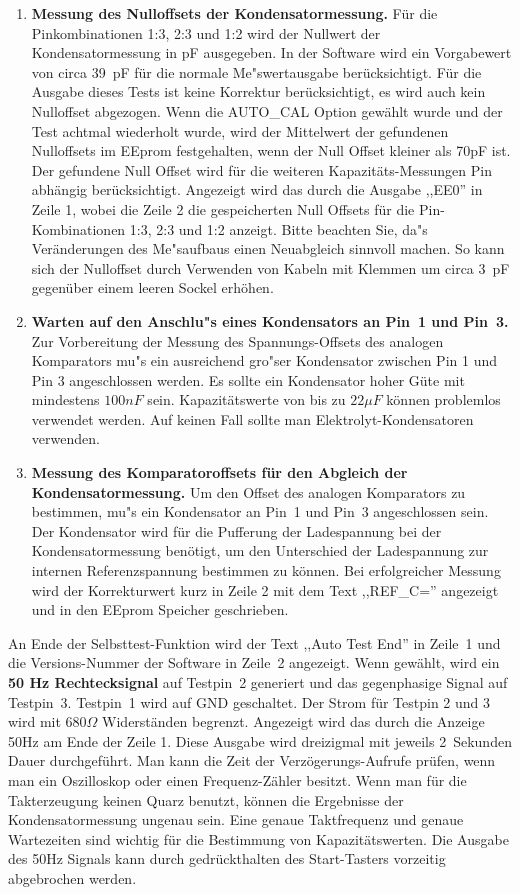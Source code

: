 \begin{enumerate}
\item {\bf Messung des Nulloffsets der Kondensatormessung.}
F\"ur die Pinkombinationen 1:3, 2:3 und 1:2 wird der Nullwert der Kondensatormessung in pF ausgegeben.
In der Software wird ein Vorgabewert von circa 39~pF f\"ur die normale Me"swertausgabe ber\"ucksichtigt.
F\"ur die Ausgabe dieses Tests ist keine Korrektur ber\"ucksichtigt, es wird auch kein Nulloffset abgezogen.
Wenn die AUTO\_CAL Option gew\"ahlt wurde und der Test achtmal wiederholt wurde, wird der Mittelwert
der gefundenen Nulloffsets im EEprom festgehalten, wenn der Null Offset kleiner als 70pF ist.
Der gefundene Null Offset wird f\"ur die weiteren Kapazit\"ats-Messungen Pin abh\"angig ber\"ucksichtigt.
Angezeigt wird das durch die Ausgabe ,,EE0''  in Zeile 1, wobei die Zeile 2 die gespeicherten Null Offsets f\"ur
die Pin-Kombinationen 1:3, 2:3 und 1:2 anzeigt.
Bitte beachten Sie, da"s Ver\"anderungen des Me"saufbaus einen Neuabgleich sinnvoll machen.
So kann sich der Nulloffset durch Verwenden von Kabeln mit Klemmen um circa 3~pF gegen\"uber einem leeren
Sockel erh\"ohen.

\item {\bf Warten auf den Anschlu"s eines Kondensators an Pin~1 und Pin~3.}
Zur Vorbereitung der Messung des Spannungs-Offsets des analogen Komparators mu"s ein ausreichend gro"ser
Kondensator zwischen Pin 1 und Pin 3 angeschlossen werden.
 Es sollte ein Kondensator hoher G\"ute mit
mindestens \(100 nF\) sein. Kapazit\"atswerte von bis zu \(22 \mu F\) k\"onnen problemlos verwendet werden.
Auf keinen Fall sollte man Elektrolyt-Kondensatoren verwenden.


\item {\bf Messung des Komparatoroffsets f\"ur den Abgleich der Kondensatormessung.}
Um den Offset des analogen Komparators zu bestimmen, mu"s ein Kondensator an Pin~1 und Pin~3 angeschlossen sein.
Der Kondensator wird f\"ur die Pufferung der Ladespannung bei der Kondensatormessung ben\"otigt, um den Unterschied der 
Ladespannung zur internen Referenzspannung bestimmen zu k\"onnen.
Bei erfolgreicher Messung wird der Korrekturwert kurz in Zeile 2 mit dem Text ,,REF\_C='' angezeigt und in den EEprom Speicher geschrieben.

\end{enumerate}

An Ende der Selbsttest-Funktion wird der Text ,,Auto Test End'' in Zeile~1 und die Versions-Nummer der Software in Zeile~2 angezeigt.
Wenn gew\"ahlt, wird ein {\bf 50 Hz Rechtecksignal} auf Testpin~2 generiert und das gegenphasige Signal auf Testpin~3.
Testpin~1 wird auf GND geschaltet. Der Strom f\"ur Testpin 2 und 3 wird mit \(680\Omega\) Widerst\"anden begrenzt.
Angezeigt wird das durch die Anzeige 50Hz am Ende der Zeile 1.
Diese Ausgabe wird dreizigmal mit jeweils 2~Sekunden Dauer durchgef\"uhrt.
Man kann die Zeit der Verz\"ogerungs-Aufrufe pr\"ufen, wenn man ein Oszilloskop oder einen
Frequenz-Z\"ahler besitzt.
Wenn man f\"ur die Takterzeugung keinen Quarz benutzt, k\"onnen die
Ergebnisse der Kondensatormessung ungenau sein.
Eine genaue Taktfrequenz und genaue Wartezeiten sind wichtig f\"ur die Bestimmung von Kapazit\"atswerten.
Die Ausgabe des 50Hz Signals kann durch gedr\"uckthalten des Start-Tasters vorzeitig abgebrochen werden.

